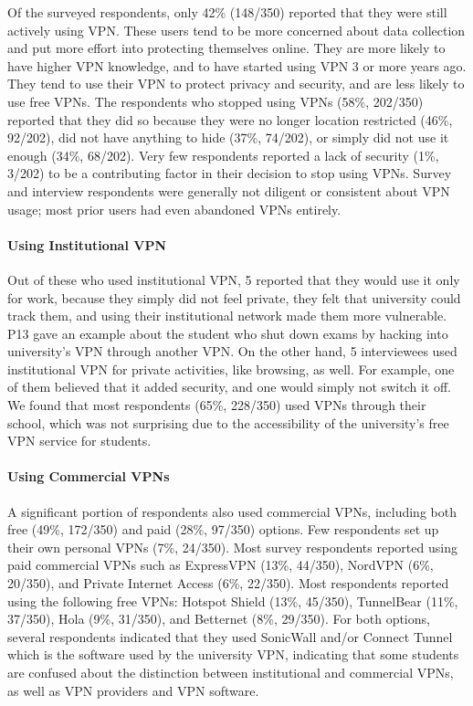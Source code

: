 Of the surveyed respondents, only 42\% (148/350) reported that they were still
actively using VPN. These users tend to be more concerned about data
collection and put more effort into protecting themselves online. They are
more likely to have higher VPN knowledge, and to have started using VPN 3 or
more years ago. They tend to use their VPN to protect privacy and security,
and are less likely to use free VPNs. The respondents who stopped using VPNs (58\%, 202/350) reported that they did
so because they were no longer location restricted (46\%, 92/202), did not
have anything to hide (37\%, 74/202), or simply did not use it enough (34\%,
68/202). Very few respondents reported a lack of security (1\%, 3/202) to be a
contributing factor in their decision to stop using VPNs. Survey and interview respondents were generally not diligent or consistent about VPN usage; most prior users had even abandoned VPNs entirely.


\paragraph{Using Institutional VPN} Out of these who used institutional
VPN, 5 reported that they would use it only for work, because they simply did
not feel private, they felt that university could track them, and using their
institutional network made them more vulnerable. P13 gave an example about the
student who shut down exams by hacking into university's VPN through another
VPN. On the other hand, 5 interviewees used institutional VPN for private
activities, like browsing, as well. For example, one of them believed that it
added security, and one would simply not switch it off. We found that most respondents (65\%, 228/350) used VPNs through their school,
which was not surprising due to the accessibility of the university’s free VPN
service for students.  

\paragraph{Using Commercial VPNs} A significant portion of respondents also used
commercial VPNs, including both free (49\%, 172/350) and paid (28\%, 97/350)
options. Few respondents set up their own personal VPNs (7\%, 24/350). Most survey respondents reported using paid commercial VPNs such as 
ExpressVPN (13\%, 44/350), NordVPN (6\%, 20/350), and Private Internet
Access (6\%, 22/350). Most respondents reported using the following free VPNs: Hotspot Shield (13\%, 45/350), TunnelBear
(11\%, 37/350), Hola (9\%, 31/350), and Betternet (8\%, 29/350). For both
options, several respondents indicated that they used SonicWall and/or Connect
Tunnel which is the software used by the university VPN, indicating that some
students are confused about the distinction between institutional and
commercial VPNs, as well as VPN providers and VPN software.


